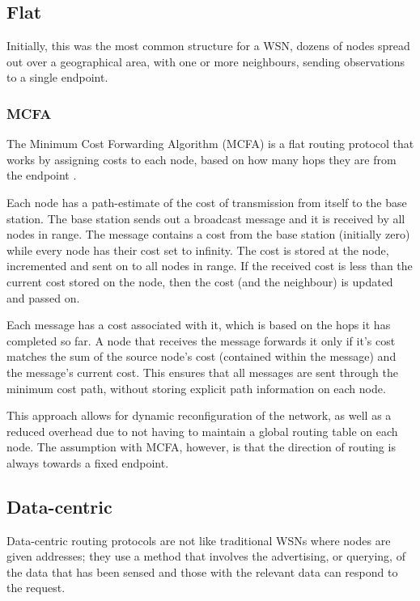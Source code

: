 \subsection{Flat}
	Initially, this was the most common structure for a WSN, dozens of nodes spread out over a geographical area, with one or more neighbours, sending observations to a single endpoint.

\subsubsection{MCFA} \label{bg:rp:mcfa}
	The Minimum Cost Forwarding Algorithm (MCFA) is a flat routing protocol that works by assigning costs to each node, based on how many hops they are from the endpoint \cite{Ye2001}. 

Each node has a path-estimate of the cost of transmission from itself to the base station. The base station sends out a broadcast message and it is received by all nodes in range. The message contains a cost from the base station (initially zero) while every node has their cost set to infinity. The cost is stored at the node, incremented and sent on to all nodes in range. If the received cost is less than the current cost stored on the node, then the cost (and the neighbour) is updated and passed on.

Each message has a cost associated with it, which is based on the hops it has completed so far. A node that receives the message forwards it only if it's cost matches the sum of the source node's cost (contained within the message) and the message's current cost. This ensures that all messages are sent through the minimum cost path, without storing explicit path information on each node.

	This approach allows for dynamic reconfiguration of the network, as well as a reduced overhead due to not having to maintain a global routing table on each node. The assumption with MCFA, however, is that the direction of routing is always towards a fixed endpoint.

\subsection{Data-centric}
	Data-centric routing protocols are not like traditional WSNs where nodes are given addresses; they use a method that involves the advertising, or querying, of the data that has been sensed and those with the relevant data can respond to the request.

